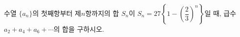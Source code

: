 수열 $\{a_n\}$의 첫째항부터 제$n$항까지의 합 $S_n$이 $S_n=27\left\{1-\left(\dfrac{2}{3}\right)^n\right\}$일 때, 급수 $a_2+a_4+a_6+\cdots$의 합을 구하시오.
